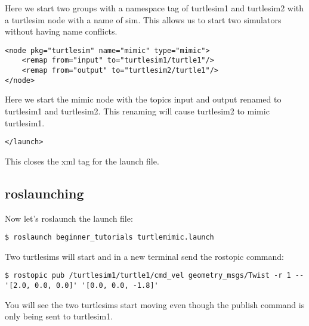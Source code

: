 Here we start two groups with a namespace tag of turtlesim1 and turtlesim2 with a turtlesim node with a name of sim. This allows us to start two simulators without having name conflicts.

\begin{lstlisting}[breaklines=true languages=xml]
<node pkg="turtlesim" name="mimic" type="mimic">
	<remap from="input" to="turtlesim1/turtle1"/>
	<remap from="output" to="turtlesim2/turtle1"/>
</node>
\end{lstlisting}

Here we start the mimic node with the topics input and output renamed to turtlesim1 and turtlesim2. This renaming will cause turtlesim2 to mimic turtlesim1.

\begin{lstlisting}[breaklines=true languages=xml]
</launch>
\end{lstlisting}

This closes the xml tag for the launch file.

\subsection{roslaunching}

Now let's roslaunch the launch file:

\begin{lstlisting}[breaklines=true languages=bash]
$ roslaunch beginner_tutorials turtlemimic.launch
\end{lstlisting}

Two turtlesims will start and in a new terminal send the rostopic command:

\begin{lstlisting}[breaklines=true languges=bash]
$ rostopic pub /turtlesim1/turtle1/cmd_vel geometry_msgs/Twist -r 1 -- '[2.0, 0.0, 0.0]' '[0.0, 0.0, -1.8]'
\end{lstlisting}
You will see the two turtlesims start moving even though the publish command is only being sent to turtlesim1.
